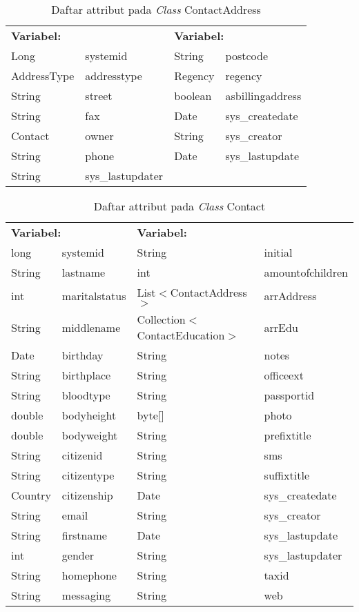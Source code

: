 \begin{table}[H]
\caption{Daftar attribut pada \textit{Class} ContactAddress}
\centering
\small
\begin{adjustbox}{width=1\textwidth}	
	\begin{tabular}{|p{4cm} p{2.1cm} p{3cm} p{3.1cm}|}
		\hline
		\multicolumn{2}{|l}{\textbf{Variabel:}}&\multicolumn{2}{l|}{\textbf{Variabel:}}\\
		Long&systemid&String&postcode\\
		AddressType&addresstype&Regency&regency\\
		String&street&boolean&asbillingaddress\\
		String&fax&Date&sys\_createdate\\
		Contact&owner&String&sys\_creator\\
		String&phone&Date&sys\_lastupdate\\
		String&sys\_lastupdater&&\\
		\hline
	\end{tabular}
\end{adjustbox}
\end{table}
\begin{table}[H]
	\caption{Daftar attribut pada \textit{Class} Contact}
	\centering
	\small
	\begin{adjustbox}{width=1\textwidth}	
		\begin{tabular}{|p{2cm} p{2.1cm} p{5cm} p{3.1cm}|}
			\hline
			\multicolumn{2}{|l}{\textbf{Variabel:}}&\multicolumn{2}{l|}{\textbf{Variabel:}}\\
			long&systemid&String&initial\\
			String&lastname&int&amountofchildren\\
			int&maritalstatus&List$<$ContactAddress$>$&arrAddress\\
			String&middlename&Collection$<$ContactEducation$>$&arrEdu\\
			Date&birthday&String&notes\\
			String&birthplace&String&officeext\\
			String&bloodtype&String&passportid\\
			double&bodyheight&byte[]&photo\\
			double&bodyweight&String&prefixtitle\\
			String&citizenid&String&sms\\
			String&citizentype&String&suffixtitle\\
			Country&citizenship&Date&sys\_createdate\\
			String&email&String&sys\_creator\\
			String&firstname&Date&sys\_lastupdate\\
			int&gender&String&sys\_lastupdater\\
			String&homephone&String&taxid\\
			String&messaging&String&web\\
			\hline
		\end{tabular}
	\end{adjustbox}
\end{table}
